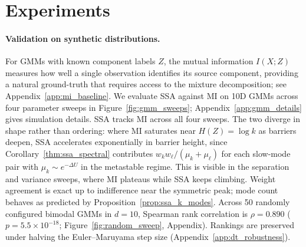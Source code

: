 \documentclass{article}
\begin{document}
\section{Experiments}
\label{sec:experiments}

\paragraph{Validation on synthetic distributions.}
For GMMs with known component labels $Z$, the mutual information $I(X;Z)$ measures how well a single observation identifies its source component, providing a natural ground-truth that requires access to the mixture decomposition; see Appendix~\ref{app:mi_baseline}. We evaluate SSA against MI on 10D GMMs across four parameter sweeps in Figure~\ref{fig:gmm_sweeps}; Appendix~\ref{app:gmm_details} gives simulation details. SSA tracks MI across all four sweeps. The two diverge in shape rather than ordering: where MI saturates near $H(Z) = \log k$ as barriers deepen, SSA accelerates exponentially in barrier height, since Corollary~\ref{thm:ssa_spectral} contributes $w_k w_\ell / (\mu_k + \mu_\ell)$ for each slow-mode pair with $\mu_k \sim e^{-\Delta U}$ in the metastable regime. This is visible in the separation and variance sweeps, where MI plateaus while SSA keeps climbing. Weight agreement is exact up to indifference near the symmetric peak; mode count behaves as predicted by Proposition~\ref{prop:ssa_k_modes}. Across 50 randomly configured bimodal GMMs in $d = 10$, Spearman rank correlation is $\rho = 0.890$ ($p = 5.5 \times 10^{-18}$; Figure~\ref{fig:random_sweep}, Appendix). Rankings are preserved under halving the Euler--Maruyama step size (Appendix~\ref{app:dt_robustness}).
\end{document}
